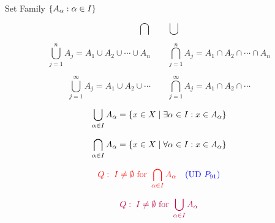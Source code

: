 \begin{frame}{}
  \centerline{\Large Set Family $\{A_{\alpha}: \alpha \in I\}$}

  \[
    \bigcap \qquad \bigcup
  \]
\end{frame}

\begin{frame}{}
    \[
      \bigcup_{j = 1}^{n} A_j = A_1 \cup A_2 \cup \cdots \cup A_n \qquad 
      \bigcap_{j = 1}^{n} A_j = A_1 \cap A_2 \cap \cdots \cap A_n
    \]

    \pause
    \vspace{1.00cm}
    \[
      \bigcup_{j = 1}^{\infty} A_j = A_1 \cup A_2 \cup \cdots \qquad 
      \bigcap_{j = 1}^{\infty} A_j = A_1 \cap A_2 \cap \cdots 
    \]
\end{frame}

\begin{frame}{}
  \[
    \bigcup_{\alpha \in I} A_{\alpha} = \{x \in X \mid \exists \alpha \in I: x \in A_{\alpha}\}
  \]

  \[
    \bigcap_{\alpha \in I} A_{\alpha} = \{x \in X \mid \forall \alpha \in I: x \in A_{\alpha}\}
  \]

  \pause
  \vspace{0.60cm}
  \[
    \textcolor{red}{Q: \; I \neq \emptyset \text{ for } \bigcap_{\alpha \in I} A_{\alpha}} \quad \textcolor{blue}{(\text{UD } P_{91})}
  \]

  \pause
  \vspace{0.60cm}
  \[
    \textcolor{purple}{Q: \; I \neq \emptyset \text{ for } \bigcup_{\alpha \in I} A_{\alpha}}
  \]
\end{frame}

